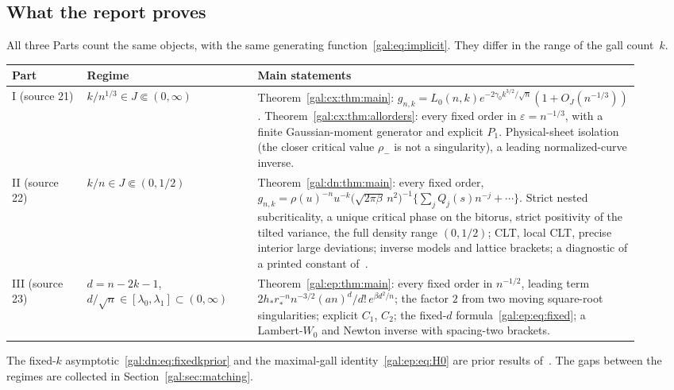 \documentclass[11pt,letterpaper]{article}
\numberwithin{equation}{section}
\theoremstyle{definition}\newtheorem{definition}[theorem]{Definition}
\theoremstyle{remark}\newtheorem{remark}[theorem]{Remark}
\newcommand{\eps}{\varepsilon}
\begin{document}
\subsection*{What the report proves}
\label{gal:guide:results}
All three Parts count the same objects, with the same generating function~\eqref{gal:eq:implicit}. They differ in the range of the gall count~$k$.
\begin{center}
\small
\begin{tabular}{@{}>{\raggedright\arraybackslash}p{0.11\linewidth}>{\raggedright\arraybackslash}p{0.25\linewidth}>{\raggedright\arraybackslash}p{0.56\linewidth}@{}}
\toprule
Part & Regime & Main statements\\
\midrule
I (source 21) & $k/n^{1/3}\in J\Subset(0,\infty)$ & Theorem~\ref{gal:cx:thm:main}: $g_{n,k}=L_0(n,k)e^{-2\gamma_0k^{3/2}/\sqrt n}(1+O_J(n^{-1/3}))$. Theorem~\ref{gal:cx:thm:allorders}: every fixed order in $\eps=n^{-1/3}$, with a finite Gaussian-moment generator and explicit $P_1$. Physical-sheet isolation (the closer critical value $\rho_-$ is not a singularity), a leading normalized-curve inverse.\\
II (source 22) & $k/n\in J\Subset(0,1/2)$ & Theorem~\ref{gal:dn:thm:main}: every fixed order, $g_{n,k}=\rho(u)^{-n}u^{-k}\bigl(\sqrt{2\pi\beta}\,n^2\bigr)^{-1}\{\sum_jQ_j(s)n^{-j}+\cdots\}$. Strict nested subcriticality, a unique critical phase on the bitorus, strict positivity of the tilted variance, the full density range $(0,1/2)$; CLT, local CLT, precise interior large deviations; inverse models and lattice brackets; a diagnostic of a printed constant of~\cite{comparison}.\\
III (source 23) & $d=n-2k-1$, $d/\sqrt n\in[\lambda_0,\lambda_1]\subset(0,\infty)$ & Theorem~\ref{gal:ep:thm:main}: every fixed order in $n^{-1/2}$, leading term $2h_*r_*^{-n}n^{-3/2}(an)^d/d!\,e^{\beta d^2/n}$; the factor $2$ from two moving square-root singularities; explicit $C_1$, $C_2$; the fixed-$d$ formula~\eqref{gal:ep:eq:fixed}; a Lambert-$W_0$ and Newton inverse with spacing-two brackets.\\
\bottomrule
\end{tabular}
\end{center}
The fixed-$k$ asymptotic~\eqref{gal:dn:eq:fixedkprior} and the maximal-gall identity~\eqref{gal:ep:eq:H0} are prior results of~\cite{comparison}. The gaps between the regimes are collected in Section~\ref{gal:sec:matching}.
\end{document}
